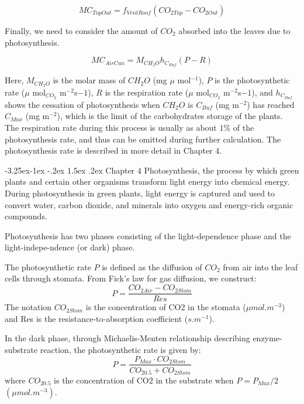 \documentclass[a4paper]{article}
\makeatletter
\newcounter{subsubsubsection}[subsubsection]
\newcommand\subsubsubsection{\@startsection{subsubsubsection}{4}{\z@}%
                                     {-3.25ex\@plus-1ex \@minus-.2ex}%
                                     {1.5ex \@plus.2ex}%
                                     {\normalfont\normalsize\bfseries}}
\makeatother
\begin{document}
$$MC_{TopOut} = f_{VentRoof}(CO_{2 Top} - CO_{2 Out})$$


Finally, we need to consider the amount of $CO_2$ absorbed into the leaves due to photosynthesis.

$$MC_{AirCan} = M_{CH_2O} h_{C_{Buf}} (P - R)$$

Here, $M_{CH_2O}$ is the molar mass of $CH_2O$ (mg $\mu$ mol$^{-1}$), $P$ is the photosynthetic rate ($\mu$ mol$_{CO_2}$ m$^{-2}$s${-1}$), $R$ is the respiration rate ($\mu$ mol$_{CO_2}$ m$^{-2}$s${-1}$), and $h_{C_{Buf}}$ shows the cessation of photosynthesis when $CH_2O$ is $C_{Buf}$ (mg m$^{-2}$) has reached $C_{Max}$ (mg m$^{-2}$), which is the limit of the carbohydrates storage of the plants. The respiration rate during this process is usually as about $1\%$ of the photosynthesis rate, and thus can be omitted during further calculation. The photosynthesis rate is described in more detail in Chapter 4.



\subsubsubsection{Chapter 4}
\setcounter{equation}{19}
Photosynthesis, the process by which green plants and certain other organisms transform light energy into chemical energy. During photosynthesis in green plants, light energy is captured and used to convert water, carbon dioxide, and minerals into oxygen and energy-rich organic compounds.

Photosynthesis has two phases consisting of the light-dependence phase and the light-indepe-ndence (or dark) phase.

The photosynthetic rate $P$ is defined as the diffusion of $CO_2$ from air into the leaf cells through stomata. From Fick's law for gas diffusion, we construct:
\begin{equation}
  P = \frac{CO_{2Air} - CO_{2Stom}}{Res}
\end{equation}
The notation $CO_{2 Stom}$ is the concentration of CO2 in the stomata ($\mu mol.m^{-3}$) and Res is the resistance-to-absorption coefficient ($s.m^{-1}$).

In the dark phase, through Michaelis-Menten relationship describing enzyme-substrate reaction, the photosynthetic rate is given by:
\begin{equation}
  P = \frac{P_{Max} \cdot CO_{2Stom}}{CO_{2 0.5} + CO_{2Stom}}
\end{equation}
where $CO_{2 0.5}$ is the concentration of CO2 in the substrate when $P = P_{Max}/2$ $(\mu mol.m^{-3})$.
\end{document}
